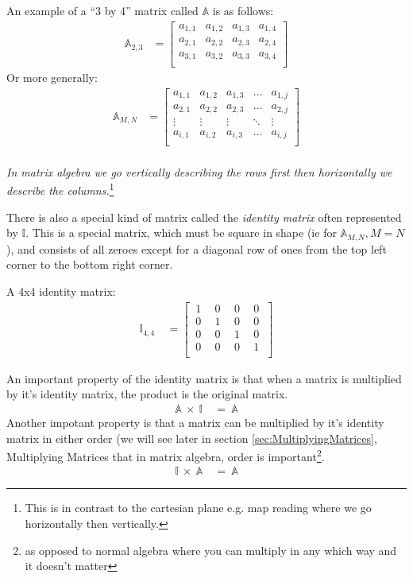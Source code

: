 An example of a ``3 by 4'' matrix called $\mathbb{A}$ is as follows:
\begin{align}
\mathbb{A}_{2,3} & = 
\begin{bmatrix}
  a_{1,1}   &   a_{1,2}   &   a_{1,3}   &   a_{1,4}   \\
  a_{2,1}   &   a_{2,2}   &   a_{2,3}   &   a_{2,4}   \\
  a_{3,1}   &   a_{3,2}   &   a_{3,3}   &   a_{3,4}   \\
\end{bmatrix}
\end{align}
Or more generally:
\begin{align}
\mathbb{A}_{M,N} & = 
\begin{bmatrix}
  a_{1,1}   &   a_{1,2}   &   a_{1,3}   &   \ldots   &   a_{1,j}   \\
  a_{2,1}   &   a_{2,2}   &   a_{2,3}   &   \ldots   &   a_{2,j}   \\
  \vdots    &   \vdots    &   \vdots    &   \ddots   &   \vdots    \\
  a_{i,1}   &   a_{i,2}   &   a_{i,3}   &   \ldots   &   a_{i,j}   \\
\end{bmatrix}
\label{eq:FormOfMatrices}
\end{align}
\\
\emph{In matrix algebra we go vertically describing the rows first then
horizontally we describe the columns.}\footnote{This is in contrast to the
cartesian plane e.g. map reading where we go horizontally then vertically.}

There is also a special kind of matrix called the \emph{identity matrix} often
represented by $\mathbb{I}$. This is a special matrix, which must be square in
shape (ie for $\mathbb{A}_{M,N}, M = N$), and consists of all zeroes except for
a diagonal row of ones from the top left corner to the bottom right corner.

A 4x4 identity matrix:
\begin{align}
  \mathbb{I}_{4,4}~&=
  \begin{bmatrix}
    ~1~&~0~&~0~&~0~\\
    ~0~&~1~&~0~&~0~\\
    ~0~&~0~&~1~&~0~\\
    ~0~&~0~&~0~&~1~\\
  \end{bmatrix}
  \label{eq:4x4IdentityMatrix}
\end{align}

An important property of the identity matrix is that when a matrix is multiplied
by it's identity matrix, the product is the original matrix.
\begin{align}
  \mathbb{A}~\times~\mathbb{I}~&=~\mathbb{A}
\end{align}
Another impotant property is that a matrix can be multiplied by it's identity
matrix in either order (we will see later in section
\ref{sec:MultiplyingMatrices}, Multiplying Matrices that in matrix
algebra, order is important\footnote{as opposed to normal algebra where you can
multiply in any which way and it doesn't matter}.
\begin{align}
  \mathbb{I}~\times~\mathbb{A}~&=~\mathbb{A}
\end{align}

